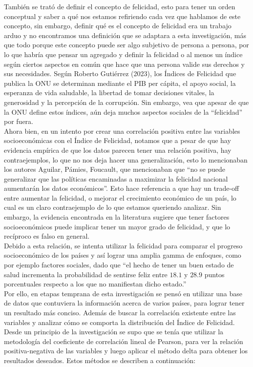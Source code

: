 También se trató de definir el concepto de felicidad, esto para tener un orden conceptual y saber a qué nos estamos refiriendo cada vez que hablamos de este concepto, sin embargo, definir qué es el concepto de felicidad era un trabajo arduo y no encontramos una definición que se adaptara a esta investigación, más que todo porque este concepto puede ser algo subjetivo de persona a persona, por lo que habría que pensar un agregado y definir la felicidad o al menos un índice según ciertos aspectos en común que hace que una persona valide sus derechos y sus necesidades. Según Roberto Gutiérrez (2023), los Índices de Felicidad que publica la ONU se determinan mediante el PIB per cápita, el apoyo social, la esperanza de vida saludable, la libertad de tomar decisiones vitales, la generosidad y la percepción de la corrupción. Sin embargo, vea que apesar de que la ONU define estos índices, aún deja muchos aspectos sociales de la ``felicidad'' por fuera. \\

Ahora bien, en un intento por crear una correlación positiva entre las variables socioeconómicas con el Índice de Felicidad, notamos que a pesar de que hay evidencia empírica de que los datos parecen tener una relación positiva, hay contraejemplos, lo que no nos deja hacer una generalización, esto lo mencionaban los autores Aguilar, Pámies, Foucault, que mencionaban que ``no se puede generalizar que las políticas encaminadas a maximizar la felicidad nacional aumentarán los datos económicos''. Esto hace referencia a que hay un trade-off entre aumentar la felicidad, o mejorar el crecimiento económico de un país, lo cual es un claro contraejemplo de lo que estamos queriendo analizar. Sin embargo, la evidencia encontrada en la literatura sugiere que tener factores socioeconómicos puede implicar tener un mayor grado de felicidad, y que lo recíproco es falso en general. \\

Debido a esta relación, se intenta utilizar la felicidad para comparar el progreso socioeconómico de los países y así lograr una amplia gamma de enfoques, como por ejemplo factores sociales, dado que ``el hecho de tener un buen estado de salud incrementa la probabilidad de sentirse feliz entre $18.1$ y $28.9$ puntos porcentuales respecto a los que no manifiestan dicho estado.''\\

Por ello, en etapas temprana de esta investigación se pensó en utilizar una base de datos que contuviera la información acerca de varios países, para lograr tener un resultado más conciso. Además de buscar la correlación existente entre las variables y analizar cómo se comporta la distribución del Índice de Felicidad. Desde un principio de la investigación se supo que se tenía que utilizar la metodología del coeficiente de correlación lineal de Pearson, para ver la relación positiva-negativa de las variables y luego aplicar el método delta para obtener los resultados deseados. Estos métodos se describen a continuación: \\

